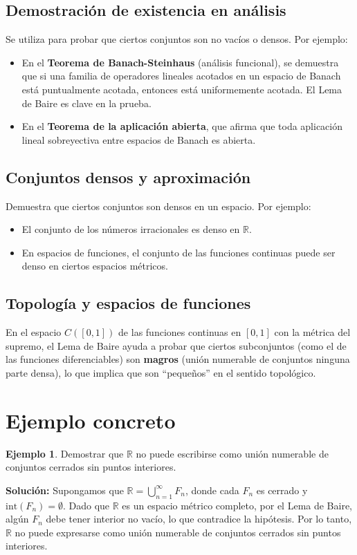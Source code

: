 \documentclass[12pt]{book}
\theoremstyle{definition}
\newtheorem{ejemplo}{Ejemplo}[section]
\theoremstyle{plain}
\theoremstyle{remark}
\begin{document}
\subsection*{Demostración de existencia en análisis}
Se utiliza para probar que ciertos conjuntos son no vacíos o densos. Por ejemplo:
\begin{itemize}
    \item En el \textbf{Teorema de Banach-Steinhaus} (análisis funcional), se demuestra que si una familia de operadores lineales acotados en un espacio de Banach está puntualmente acotada, entonces está uniformemente acotada. El Lema de Baire es clave en la prueba.
    \item En el \textbf{Teorema de la aplicación abierta}, que afirma que toda aplicación lineal sobreyectiva entre espacios de Banach es abierta.
\end{itemize}

\subsection*{Conjuntos densos y aproximación}
Demuestra que ciertos conjuntos son densos en un espacio. Por ejemplo:
\begin{itemize}
    \item El conjunto de los números irracionales es denso en \( \mathbb{R} \).
    \item En espacios de funciones, el conjunto de las funciones continuas puede ser denso en ciertos espacios métricos.
\end{itemize}

\subsection*{Topología y espacios de funciones}
En el espacio \( C([0,1]) \) de las funciones continuas en \([0,1]\) con la métrica del supremo, el Lema de Baire ayuda a probar que ciertos subconjuntos (como el de las funciones diferenciables) son \textbf{magros} (unión numerable de conjuntos ninguna parte densa), lo que implica que son ``pequeños'' en el sentido topológico.

\section*{Ejemplo concreto}
\begin{ejemplo}
Demostrar que \( \mathbb{R} \) no puede escribirse como unión numerable de conjuntos cerrados sin puntos interiores.

\textbf{Solución:}
Supongamos que \( \mathbb{R} = \bigcup_{n=1}^\infty F_n \), donde cada \( F_n \) es cerrado y \( \text{int}(F_n) = \emptyset \). Dado que \( \mathbb{R} \) es un espacio métrico completo, por el Lema de Baire, algún \( F_n \) debe tener interior no vacío, lo que contradice la hipótesis. Por lo tanto, \( \mathbb{R} \) no puede expresarse como unión numerable de conjuntos cerrados sin puntos interiores.
\end{ejemplo}
\end{document}
